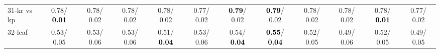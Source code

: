 \begin{table}[h]
\begin{center}
{\begin{tabular}{lc|c|c|c|c|c|c|c|c|c|c}
31-kr vs kp &   0.78/\textcolor{black}{\textbf{  0.01}} &   0.78/  0.02 &   0.78/  0.02 &   0.78/  0.02 &   0.77/  0.02 & \textcolor{black}{\textbf{  0.79}}/  0.02 & \textcolor{black}{\textbf{  0.79}}/  0.02 &   0.78/  0.02 &   0.78/  0.02 &   0.78/\textcolor{black}{\textbf{  0.01}} &   0.77/  0.02 \\
32-leaf &   0.53/  0.05 &   0.53/  0.06 &   0.53/  0.06 &   0.51/\textcolor{black}{\textbf{  0.04}} &   0.53/  0.06 &   0.54/\textcolor{black}{\textbf{  0.04}} & \textcolor{black}{\textbf{  0.55}}/\textcolor{black}{\textbf{  0.04}} &   0.52/  0.05 &   0.49/  0.06 &   0.52/  0.05 &   0.49/  0.05 \\\end{tabular}}\label{stratsBalAcc0b5NN}
\end{center}
\end{table}
